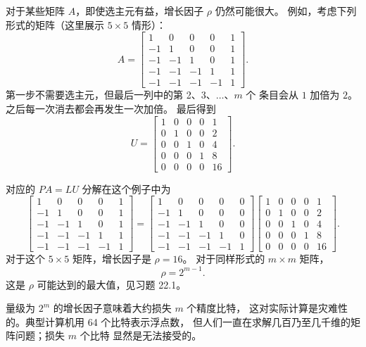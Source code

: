 \documentclass[UTF8,fontset=none,12pt]{ctexart}
\begin{document}
对于某些矩阵 $A$，即使选主元有益，增长因子 $\rho$ 仍然可能很大。
例如，考虑下列形式的矩阵（这里展示 $5\times5$ 情形）：
\begin{equation}
 A=
 \begin{bmatrix}
 1&0&0&0&1\\
 -1&1&0&0&1\\
 -1&-1&1&0&1\\
 -1&-1&-1&1&1\\
 -1&-1&-1&-1&1
 \end{bmatrix}.
 \tag{22.4}
\end{equation}
第一步不需要选主元，但最后一列中的第 2、3、$\ldots$、$m$ 个
条目会从 $1$ 加倍为 $2$。之后每一次消去都会再发生一次加倍。
最后得到
\begin{equation}
 U=
 \begin{bmatrix}
 1&0&0&0&1\\
 0&1&0&0&2\\
 0&0&1&0&4\\
 0&0&0&1&8\\
 0&0&0&0&16
 \end{bmatrix}.
 \tag{22.5}
\end{equation}

对应的 $PA=LU$ 分解在这个例子中为
\begin{equation*}
\begin{bmatrix}
 1&0&0&0&1\\
 -1&1&0&0&1\\
 -1&-1&1&0&1\\
 -1&-1&-1&1&1\\
 -1&-1&-1&-1&1
\end{bmatrix}
=
\begin{bmatrix}
 1&0&0&0&0\\
 -1&1&0&0&0\\
 -1&-1&1&0&0\\
 -1&-1&-1&1&0\\
 -1&-1&-1&-1&1
\end{bmatrix}
\begin{bmatrix}
 1&0&0&0&1\\
 0&1&0&0&2\\
 0&0&1&0&4\\
 0&0&0&1&8\\
 0&0&0&0&16
\end{bmatrix}.
\end{equation*}
对于这个 $5\times5$ 矩阵，增长因子是 $\rho=16$。
对于同样形式的 $m\times m$ 矩阵，
\[
 \rho=2^{m-1}.
\]
这是 $\rho$ 可能达到的最大值，见习题 22.1。

量级为 $2^m$ 的增长因子意味着大约损失 $m$ 个精度比特，
这对实际计算是灾难性的。典型计算机用 64 个比特表示浮点数，
但人们一直在求解几百乃至几千维的矩阵问题；损失 $m$ 个比特
显然是无法接受的。
\end{document}
